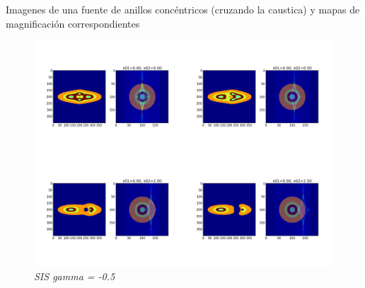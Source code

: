 \documentclass[12pt]{book}
\begin{document}
Imagenes de una fuente de anillos concéntricos (cruzando la caustica) y mapas de magnificación correspondientes
\begin{figure}[!h]
 \centering
 \includegraphics[scale=0.3]{caustic.png}
 \caption{\emph{SIS gamma = -0.5}}
 \label{Fig: 6}
\end{figure}
\end{document}
